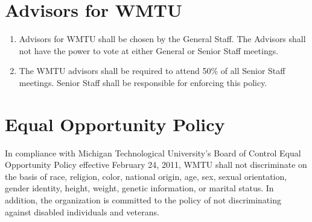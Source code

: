 \documentclass[12pt]{constitution}
\begin{document}
\section{​Advisors for WMTU}
\begin{enumerate}
\item Advisors for WMTU shall be chosen by the General Staff. The Advisors shall not have the power to vote at either General or Senior Staff meetings.
\item The WMTU advisors shall be required to attend 50\% of all Senior Staff meetings. Senior Staff shall be responsible for enforcing this policy.
\end{enumerate}


\section{​Equal Opportunity Policy}
In compliance with Michigan Technological University's Board of Control Equal Opportunity Policy effective February 24, 2011, WMTU shall not discriminate on the basis of race, religion, color, national origin, age, sex, sexual orientation, gender identity, height, weight, genetic information, or marital status. In addition, the organization is committed to the policy of not discriminating against disabled individuals and veterans.


\end{document}
